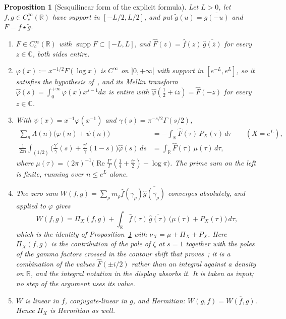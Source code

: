 \documentclass[11pt]{article}
\newtheorem{proposition}[theorem]{Proposition}
\theoremstyle{definition}
\newcommand{\R}{\mathbb{R}}
\begin{document}
\begin{proposition}[Sesquilinear form of the explicit formula]\label{prop:weil}
Let $L>0$, let $f,g\in C^\infty_c(\R)$ have support in $[-L/2,L/2]$, and put
$\tilde g(u)=\overline{g(-u)}$ and $F=f\star\tilde g$.
\begin{enumerate}
\item[(i)] $F\in C^\infty_c(\R)$ with $\operatorname{supp}F\subset[-L,L]$, and
$\widehat F(z)=\widehat f(z)\,\overline{\widehat g(\bar z)}$ for every
$z\in\mathbb{C}$, both sides entire.
\item[(ii)] $\varphi(x):=x^{-1/2}F(\log x)$ is $C^\infty$ on $]0,+\infty[$ with
support in $[e^{-L},e^{L}]$, so it satisfies the hypothesis
of~\cite[Theorem~5.11]{IK04}, and its Mellin transform
$\widehat\varphi(s)=\int_0^{+\infty}\varphi(x)x^{s-1}dx$ is entire with
$\widehat\varphi(\tfrac12+iz)=\widehat F(-z)$ for every $z\in\mathbb{C}$.
\item[(iii)] With $\psi(x)=x^{-1}\varphi(x^{-1})$ and
$\gamma(s)=\pi^{-s/2}\Gamma(s/2)$,
\begin{align*}
  \sum_n\Lambda(n)\big(\varphi(n)+\psi(n)\big)
  &=-\int_\R\widehat F(\tau)\,P_X(\tau)\,d\tau\qquad(X=e^{L}),\\
  \frac{1}{2\pi i}\int_{(1/2)}\Big(\frac{\gamma'}{\gamma}(s)+\frac{\gamma'}{\gamma}(1-s)\Big)\widehat\varphi(s)\,ds
  &=\int_\R\widehat F(\tau)\,\mu(\tau)\,d\tau,
\end{align*}
where $\mu(\tau)=(2\pi)^{-1}\big(\operatorname{Re}\tfrac{\Gamma'}{\Gamma}(\tfrac14+\tfrac{i\tau}{2})-\log\pi\big)$.
The prime sum on the left is finite, running over $n\le e^{L}$ alone.
\item[(iv)] The zero sum
$W(f,g)=\sum_\rho m_\rho\widehat f(\gamma_\rho)\overline{\widehat g(\overline{\gamma_\rho})}$
converges absolutely, and~\cite[Theorem~5.11]{IK04} applied to $\varphi$ gives
\[
  W(f,g)=\Pi_X(f,g)+\int_\R\widehat f(\tau)\,\overline{\widehat g(\tau)}\,
        \big(\mu(\tau)+P_X(\tau)\big)\,d\tau ,
\]
which is the identity of Proposition~\ref{prop:weil} with $\nu_X=\mu+\Pi_X+P_X$. Here
$\Pi_X(f,g)$ is the contribution of the pole of $\zeta$ at $s=1$ together with
the poles of the gamma factors crossed in the contour shift that
proves~\cite[Theorem~5.11]{IK04}; it is a combination of the values
$\widehat F(\pm i/2)$ rather than an integral against a density on $\R$, and the
integral notation in the display absorbs it. It is taken as input; no step of the argument
uses its value.
\item[(v)] $W$ is linear in $f$, conjugate-linear in $g$, and Hermitian:
$W(g,f)=\overline{W(f,g)}$. Hence $\Pi_X$ is Hermitian as well.
\end{enumerate}
\end{proposition}
\end{document}
